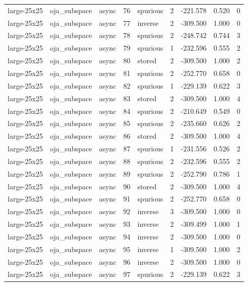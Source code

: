 \begin{tabular}{lllrlrrrr}
large-25x25 & oja\_subspace & async & 76 & spurious & 2 & -221.578 & 0.520 & 0 \\
large-25x25 & oja\_subspace & async & 77 & inverse & 2 & -309.500 & 1.000 & 0 \\
large-25x25 & oja\_subspace & async & 78 & spurious & 2 & -248.742 & 0.744 & 3 \\
large-25x25 & oja\_subspace & async & 79 & spurious & 1 & -232.596 & 0.555 & 2 \\
large-25x25 & oja\_subspace & async & 80 & stored & 2 & -309.500 & 1.000 & 2 \\
large-25x25 & oja\_subspace & async & 81 & spurious & 2 & -252.770 & 0.658 & 0 \\
large-25x25 & oja\_subspace & async & 82 & spurious & 1 & -229.139 & 0.622 & 3 \\
large-25x25 & oja\_subspace & async & 83 & stored & 2 & -309.500 & 1.000 & 4 \\
large-25x25 & oja\_subspace & async & 84 & spurious & 2 & -210.649 & 0.549 & 0 \\
large-25x25 & oja\_subspace & async & 85 & spurious & 2 & -235.660 & 0.626 & 2 \\
large-25x25 & oja\_subspace & async & 86 & stored & 2 & -309.500 & 1.000 & 4 \\
large-25x25 & oja\_subspace & async & 87 & spurious & 1 & -231.556 & 0.526 & 2 \\
large-25x25 & oja\_subspace & async & 88 & spurious & 2 & -232.596 & 0.555 & 2 \\
large-25x25 & oja\_subspace & async & 89 & spurious & 2 & -252.790 & 0.786 & 1 \\
large-25x25 & oja\_subspace & async & 90 & stored & 2 & -309.500 & 1.000 & 4 \\
large-25x25 & oja\_subspace & async & 91 & spurious & 2 & -252.770 & 0.658 & 0 \\
large-25x25 & oja\_subspace & async & 92 & inverse & 3 & -309.500 & 1.000 & 0 \\
large-25x25 & oja\_subspace & async & 93 & inverse & 2 & -309.499 & 1.000 & 1 \\
large-25x25 & oja\_subspace & async & 94 & inverse & 2 & -309.500 & 1.000 & 0 \\
large-25x25 & oja\_subspace & async & 95 & inverse & 1 & -309.500 & 1.000 & 2 \\
large-25x25 & oja\_subspace & async & 96 & inverse & 2 & -309.500 & 1.000 & 0 \\
large-25x25 & oja\_subspace & async & 97 & spurious & 2 & -229.139 & 0.622 & 3 \\

\end{tabular}

